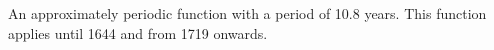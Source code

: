 An approximately periodic function with a period of 10.8 years. This function applies until 1644 and from 1719 onwards.
